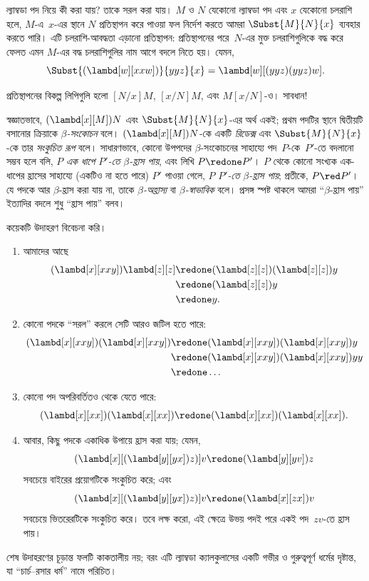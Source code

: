 \documentclass[../../../include/open-logic-section]{subfiles}
\begin{document}

ল্যাম্বডা পদ নিয়ে কী করা যায়? তাকে সরল করা যায়। $M$ ও $N$ যেকোনো
ল্যাম্বডা পদ এবং $x$ যেকোনো চলরাশি হলে, $M$-এ~$x$-এর স্থানে $N$
প্রতিস্থাপন করে পাওয়া ফল নির্দেশ করতে আমরা $\Subst{M}{N}{x}$ ব্যবহার করতে
পারি। এটি চলরাশি-আবদ্ধতা এড়ানো প্রতিস্থাপন: প্রতিস্থাপনের পরে~$N$-এর মুক্ত
চলরাশিগুলিকে বদ্ধ করে ফেলত এমন $M$-এর বদ্ধ চলরাশিগুলির নাম আগে বদলে নিতে
হয়। যেমন,
\[
\Subst{(\lambd[w][xxw])}{yyz}{x} = \lambd[w][(yyz)(yyz)w].
\]

\begin{digress}
প্রতিস্থাপনের বিকল্প লিপিগুলি হলো $[N/x]M$, $[x/N]M$, এবং
$M[x/N]$-ও। সাবধান!
\end{digress}

স্বজ্ঞাতভাবে, $(\lambd[x][M])N$ এবং $\Subst{M}{N}{x}$-এর অর্থ একই;
প্রথম পদটির স্থানে দ্বিতীয়টি বসানোর ক্রিয়াকে \emph{$\beta$-সংকোচন}
বলে। $(\lambd[x][M])N$-কে একটি \emph{রিডেক্স} এবং
$\Subst{M}{N}{x}$-কে তার \emph{সংকুচিত রূপ} বলে। সাধারণভাবে, কোনো
উপপদের $\beta$-সংকোচনের সাহায্যে পদ~$P$-কে~$P'$-তে বদলানো সম্ভব হলে বলি,
$P$ \emph{এক ধাপে $P'$-তে $\beta$-হ্রাস পায়}, এবং লিখি $P \redone
P'$। $P$ থেকে কোনো সংখ্যক এক-ধাপের হ্রাসের সাহায্যে (একটিও না হতে পারে)
$P'$ পাওয়া গেলে, $P$ \emph{$P'$-তে $\beta$-হ্রাস পায়}; প্রতীকে,
$P \red P'$। যে পদকে আর $\beta$-হ্রাস করা যায় না, তাকে
\emph{$\beta$-অহ্রাস্য} বা \emph{$\beta$-স্বাভাবিক} বলে। প্রসঙ্গ
স্পষ্ট থাকলে আমরা ``$\beta$-হ্রাস পায়'' ইত্যাদির বদলে শুধু ``হ্রাস পায়''
বলব।

কয়েকটি উদাহরণ বিবেচনা করি।
\begin{enumerate}
\item আমাদের আছে
\begin{align*}
(\lambd[x][xxy]) \lambd[z][z] & \redone (\lambd[z][z])(\lambd[z][z]) y \\
& \redone (\lambd[z][z]) y \\
& \redone y.
\end{align*}
\item কোনো পদকে ``সরল'' করলে সেটি আরও জটিল হতে পারে:
\begin{align*}
(\lambd[x][xxy])(\lambd[x][xxy]) & \redone (\lambd[x][xxy])(\lambd[x][xxy])y \\
& \redone (\lambd[x][xxy])(\lambd[x][xxy])yy \\
& \redone \dots
\end{align*}
\item কোনো পদ অপরিবর্তিতও থেকে যেতে পারে:
\[
(\lambd[x][xx])(\lambd[x][xx]) \redone (\lambd[x][xx])(\lambd[x][xx]).
\]
\item আবার, কিছু পদকে একাধিক উপায়ে হ্রাস করা যায়; যেমন,
\[
(\lambd[x][(\lambd[y][yx]) z)] v \redone (\lambd[y][yv]) z
\]
সবচেয়ে বাইরের প্রয়োগটিকে সংকুচিত করে; এবং
\[
(\lambd[x][(\lambd[y][yx]) z)] v \redone (\lambd[x][zx]) v
\]
সবচেয়ে ভিতরেরটিকে সংকুচিত করে। তবে লক্ষ করো, এই ক্ষেত্রে উভয় পদই পরে
একই পদ~$zv$-তে হ্রাস পায়।
\end{enumerate}

শেষ উদাহরণের চূড়ান্ত ফলটি কাকতালীয় নয়; বরং এটি ল্যাম্বডা ক্যালকুলাসের
একটি গভীর ও গুরুত্বপূর্ণ ধর্মের দৃষ্টান্ত, যা ``চার্চ--রসার ধর্ম'' নামে
পরিচিত।
\end{document}
